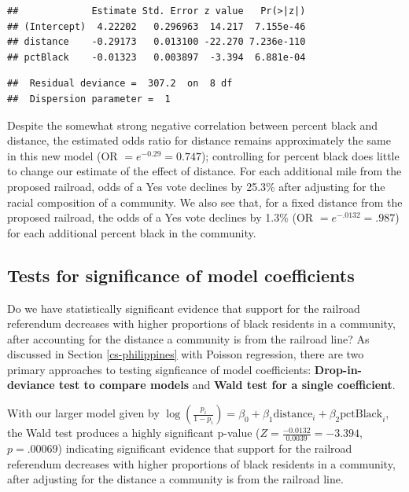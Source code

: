 \documentclass[
]{krantz}
\begin{document}
\begin{verbatim}
##             Estimate Std. Error z value   Pr(>|z|)
## (Intercept)  4.22202   0.296963  14.217  7.155e-46
## distance    -0.29173   0.013100 -22.270 7.236e-110
## pctBlack    -0.01323   0.003897  -3.394  6.881e-04
\end{verbatim}

\begin{verbatim}
##  Residual deviance =  307.2  on  8 df 
##  Dispersion parameter =  1
\end{verbatim}

Despite the somewhat strong negative correlation between percent black and distance, the estimated odds ratio for distance remains approximately the same in this new model (OR \(= e^{-0.29} = 0.747\)); controlling for percent black does little to change our estimate of the effect of distance. For each additional mile from the proposed railroad, odds of a Yes vote declines by 25.3\% after adjusting for the racial composition of a community. We also see that, for a fixed distance from the proposed railroad, the odds of a Yes vote declines by 1.3\% (OR \(= e^{-.0132} = .987\)) for each additional percent black in the community.

\hypertarget{sec-logisticInf}{%
\subsection{Tests for significance of model coefficients}\label{sec-logisticInf}}

Do we have statistically significant evidence that support for the railroad referendum decreases with higher proportions of black residents in a community, after accounting for the distance a community is from the railroad line? As discussed in Section \ref{cs-philippines} with Poisson regression, there are two primary approaches to testing signficance of model coefficients: \textbf{Drop-in-deviance test to compare models}  and \textbf{Wald test for a single coefficient}. 

With our larger model given by \(\log\left(\frac{p_i}{1-p_i}\right) = \beta_0+\beta_1\textrm{distance}_i+\beta_2\textrm{pctBlack}_i\), the Wald test produces a highly significant p-value (\(Z=\frac{-0.0132}{0.0039}= -3.394\), \(p=.00069\)) indicating significant evidence that support for the railroad referendum decreases with higher proportions of black residents in a community, after adjusting for the distance a community is from the railroad line.
\end{document}
